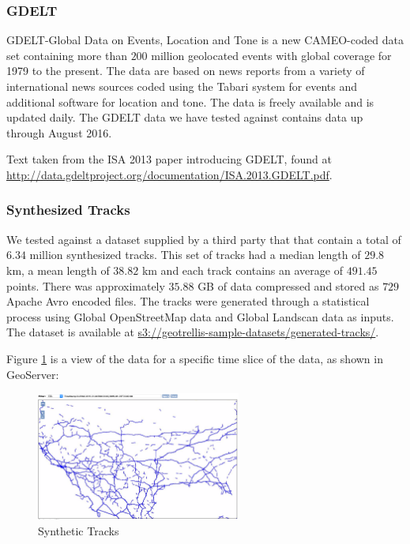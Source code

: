 \subsubsection{GDELT}
\label{sec:performance:datasets:gdelt}

GDELT-Global Data on Events, Location and Tone is a new CAMEO-coded data set containing more than $200$ million geolocated events with global coverage for 1979 to the present.
The data are based on news reports from a variety of international news sources coded using the Tabari system for events and additional software for location and tone.
The data is freely available and is updated daily.
The GDELT data we have tested against contains data up through August 2016.

Text taken from the ISA 2013 paper introducing GDELT, found at \url{http://data.gdeltproject.org/documentation/ISA.2013.GDELT.pdf}.


\subsubsection{Synthesized Tracks}
\label{sec:performance:datasets:synthesized}

We tested against a dataset supplied by a third party that that contain a total of $6.34$ million synthesized tracks.
This set of tracks had a median length of $29.8$ km, a mean length of $38.82$ km and each track contains an average of $491.45$ points.
There was approximately $35.88$ GB of data compressed and stored as $729$ Apache Avro encoded files.
The tracks were generated through a statistical process using Global OpenStreetMap data and Global Landscan data as inputs.
The dataset is available at \url{s3://geotrellis-sample-datasets/generated-tracks/}.

Figure \ref{geoserver} is a view of the data for a specific time slice of the data, as shown in GeoServer:

\begin{figure}[h!tb]
  \centering
  \includegraphics[width=0.60\textwidth]{../docs/img/tracks/synthetic-tracks.png}
  \caption{Synthetic Tracks}
  \label{geoserver}
\end{figure}
